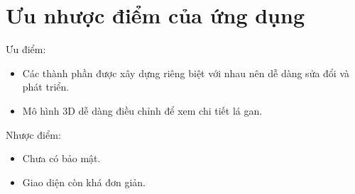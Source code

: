 \section{Ưu nhược điểm của ứng dụng}
Ưu điểm:\\
\begin{itemize}
    \item Các thành phần được xây dựng riêng biệt với nhau nên dễ dàng sửa đổi và phát triển.
    \item Mô hình 3D dễ dàng điều chỉnh để xem chi tiết lá gan.
\end{itemize}
Nhược điểm:\\
\begin{itemize}
    \item Chưa có bảo mật.
    \item Giao diện còn khá đơn giản.
\end{itemize}
